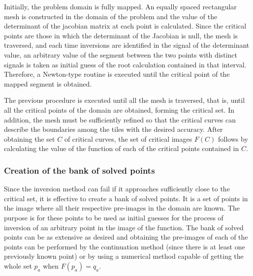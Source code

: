 \documentclass[journal=iecred,manuscript=article]{achemso}
\theoremstyle{definition}
\theoremstyle{remark}
\begin{document}
Initially, the problem domain is fully mapped. An equally spaced rectangular mesh is constructed in the domain of the problem and the value of the determinant of the jacobian matrix at each point is calculated. Since the critical points are those in which the determinant of the Jacobian is null, the mesh is traversed, and each time inversions are identified in the signal of the determinant value, an arbitrary value of the segment between the two points with distinct signals is taken as initial guess of the root calculation contained in that interval. Therefore, a Newton-type routine is executed until the critical point of the mapped segment is obtained.

The previous procedure is executed until all the mesh is traversed, that is, until all the critical points of the domain are obtained, forming the critical set. In addition, the mesh must be sufficiently refined so that the critical curves can describe the boundaries among the tiles with the desired accuracy. After obtaining the set $ C $ of critical curves, the set of critical images $F\left(C\right) $ follows by calculating the value of the function of each of the critical points contained in $ C $.

\subsubsection{Creation of the bank of solved points}

Since the inversion method can fail if it approaches sufficiently close to the critical set, it is effective to create a bank of solved points. It is a set of points in the image where all their respective pre-images in the domain are known. The purpose is for these points to be used as initial guesses for the process of inversion of an arbitrary point in the image of the function. The bank of solved points can be as extensive as desired and obtaining the pre-images of each of the points can be performed by the continuation method (since there is at least one previously known point) or by using a numerical method capable of getting the whole set $ p_{a} $ when $F\left(p_{a}\right) = q_{a} $.
\end{document}
